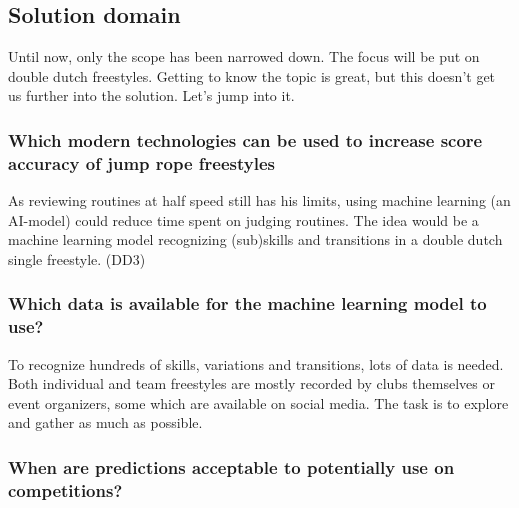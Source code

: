 


\subsection{Solution domain}
\label{proposal-subsec:proposal-intro-solution-domain}

Until now, only the scope has been narrowed down. The focus will be put on double dutch freestyles. Getting to know the topic is great, but this doesn't get us further into the solution. Let's jump into it.

\subsubsection{Which modern technologies can be used to increase score accuracy of jump rope freestyles}
\label{proposal-subsubsec:proposal-intro-question-integration}

As reviewing routines at half speed still has his limits, using machine learning (an AI-model) could reduce time spent on judging routines. The idea would be a machine learning model recognizing (sub)skills and transitions in a double dutch single freestyle. (DD3)

\subsubsection{Which data is available for the machine learning model to use?}
\label{proposal-subsubsec:proposal-intro-question-data}

To recognize hundreds of skills, variations and transitions, lots of data is needed. Both individual and team freestyles are mostly recorded by clubs themselves or event organizers, some which are available on social media. The task is to explore and gather as much as possible.

\subsubsection{When are predictions acceptable to potentially use on competitions?}
\label{proposal-subsubsec:proposal-intro-question-acceptable-results}

